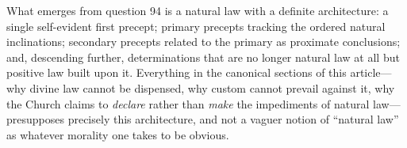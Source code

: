 What emerges from question 94 is a natural law with a definite architecture: a single self-evident first precept; primary precepts tracking the ordered natural inclinations; secondary precepts related to the primary as proximate conclusions; and, descending further, determinations that are no longer natural law at all but positive law built upon it. Everything in the canonical sections of this article---why divine law cannot be dispensed, why custom cannot prevail against it, why the Church claims to \emph{declare} rather than \emph{make} the impediments of natural law---presupposes precisely this architecture, and not a vaguer notion of ``natural law'' as whatever morality one takes to be obvious.
